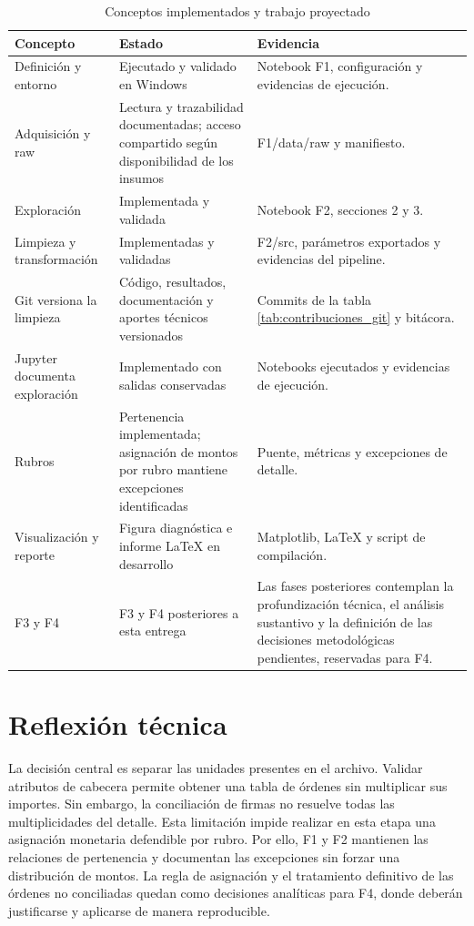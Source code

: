 \documentclass[12pt,letterpaper]{article}
\begin{document}
\begin{table}[H]
\caption{Conceptos implementados y trabajo proyectado}
\label{tab:mapa}
\small\singlespacing
\begin{tabularx}{\textwidth}{@{}>{\raggedright\arraybackslash}p{}>{\raggedright\arraybackslash}p{}Y@{}}
\toprule
Concepto & Estado & Evidencia\\
\midrule
Definición y entorno & Ejecutado y validado en Windows & Notebook F1, configuración y evidencias de ejecución.\\
Adquisición y raw & Lectura y trazabilidad documentadas; acceso compartido según disponibilidad de los insumos & F1/data/raw y manifiesto.\\
Exploración & Implementada y validada & Notebook F2, secciones 2 y 3.\\
Limpieza y transformación & Implementadas y validadas & F2/src, parámetros exportados y evidencias del pipeline.\\
Git versiona la limpieza & Código, resultados, documentación y aportes técnicos versionados & Commits de la tabla \ref{tab:contribuciones_git} y bitácora.\\
Jupyter documenta exploración & Implementado con salidas conservadas & Notebooks ejecutados y evidencias de ejecución.\\
Rubros & Pertenencia implementada; asignación de montos por rubro mantiene excepciones identificadas & Puente, métricas y excepciones de detalle.\\
Visualización y reporte & Figura diagnóstica e informe LaTeX en desarrollo & Matplotlib, LaTeX y script de compilación.\\
F3 y F4 & F3 y F4 posteriores a esta entrega & Las fases posteriores contemplan
la profundización técnica, el análisis sustantivo y la definición de las decisiones
metodológicas pendientes, reservadas para F4.\\
\bottomrule
\end{tabularx}
\end{table}


\clearpage
\section{Reflexión técnica}

La decisión central es separar las unidades presentes en el archivo. Validar
atributos de cabecera permite obtener una tabla de órdenes sin multiplicar sus
importes. Sin embargo, la conciliación de firmas no resuelve todas las multiplicidades
del detalle. Esta limitación impide realizar en esta etapa una asignación monetaria
defendible por rubro. Por ello, F1 y F2 mantienen las relaciones de pertenencia y
documentan las excepciones sin forzar una distribución de montos. La regla de
asignación y el tratamiento definitivo de las órdenes no conciliadas quedan como
decisiones analíticas para F4, donde deberán justificarse y aplicarse de manera
reproducible.
\end{document}
